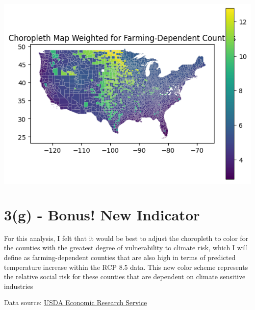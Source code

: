 \documentclass[
  letterpaper,
  DIV=11,
  numbers=noendperiod]{scrartcl}
\begin{document}
\includegraphics{Assignment-1_ICP_files/figure-pdf/cell-11-output-1.png}

\section{3(g) - Bonus! New Indicator}\label{g---bonus-new-indicator}

For this analysis, I felt that it would be best to adjust the choropleth
to color for the counties with the greatest degree of vulnerability to
climate risk, which I will define as farming-dependent counties that are
also high in terms of predicted temperature increase within the RCP 8.5
data. This new color scheme represents the relative social risk for
these counties that are dependent on climate sensitive industries

Data source:
\href{https://www.ers.usda.gov/data-products/county-typology-codes}{USDA
Economic Research Service}
\end{document}
